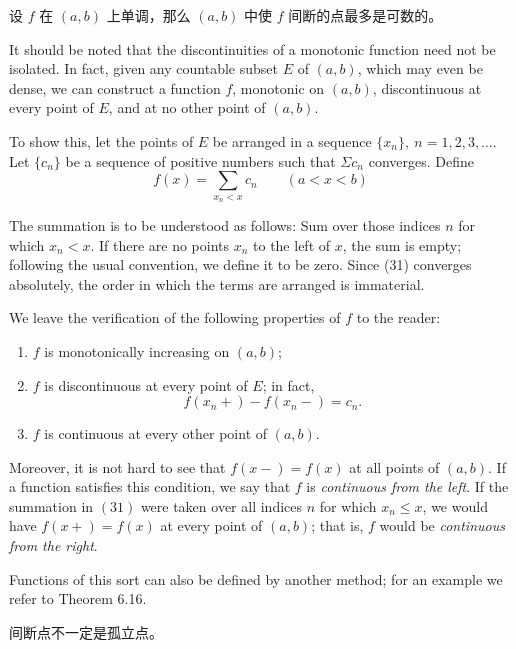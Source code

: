 \documentclass[../poma-notes.tex]{subfiles}
\begin{document}
\begin{anote}
  设 $f$ 在 $(a, b)$ 上单调，那么 $(a, b)$ 中使 $f$ 间断的点最多是可数的。
\end{anote}

\begin{remark}
  It should be noted that the discontinuities of a monotonic function need not be isolated. In fact, given any countable
  subset $E$ of $(a, b)$, which may even be dense, we can construct a function $f$, monotonic on $(a, b)$, discontinuous at
  every point of $E$, and at no other point of $(a, b)$.

  To show this, let the points of $E$ be arranged in a sequence $\{x_n\},\ n=1,2,3,\dots$. Let $\{c_n\}$ be a sequence of
  positive numbers such that $\Sigma c_n$ converges. Define
  \begin{equation}
    f(x) = \sum_{x_n < x} c_n \qquad (a<x<b)
  \end{equation}

  The summation is to be understood as follows: Sum over those indices $n$ for which $x_n < x$. If there are no points $x_n$
  to the left of $x$, the sum is empty; following the usual convention, we define it to be zero. Since (31) converges
  absolutely, the order in which the terms are arranged is immaterial.

  We leave the verification of the following properties of $f$ to the reader:
  \begin{enumerate}[label=(\alph*)]
    \item $f$ is monotonically increasing on $(a, b)$;
    \item $f$ is discontinuous at every point of $E$; in fact,
          \[
            f(x_n+) - f(x_n-) = c_n.
          \]
    \item $f$ is continuous at every other point of $(a, b)$.
  \end{enumerate}

  Moreover, it is not hard to see that $f(x-) = f(x)$ at all points of $(a, b)$. If a function satisfies this condition, we say
  that $f$ is \textit{continuous from the left}. If the summation in $(31)$ were taken over all indices $n$ for which $x_n \le x$,
  we would have $f(x+) = f(x)$ at every point of $(a, b)$; that is, $f$ would be \textit{continuous from the right}.

  Functions of this sort can also be defined by another method; for an example we refer to Theorem 6.16.
\end{remark}

\begin{anote}
  间断点不一定是孤立点。
\end{anote}
\end{document}
